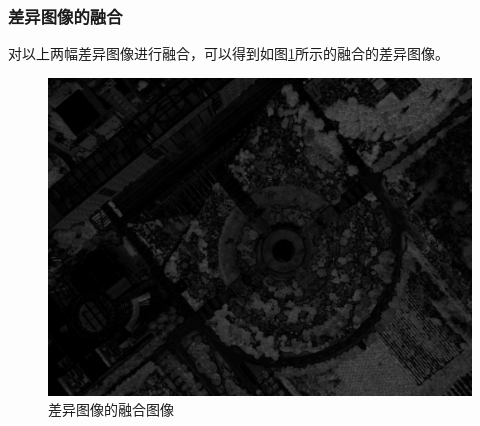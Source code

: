 \subsubsection{差异图像的融合}
对以上两幅差异图像进行融合，可以得到如图\ref{fig:dji0027differ}所示的融合的差异图像。
\begin{figure}[H]
	\centering
	\includegraphics[width=0.7\linewidth]{figure/DJI_0027_Differ.png}
	\caption{差异图像的融合图像}
	\label{fig:dji0027differ}
\end{figure}
